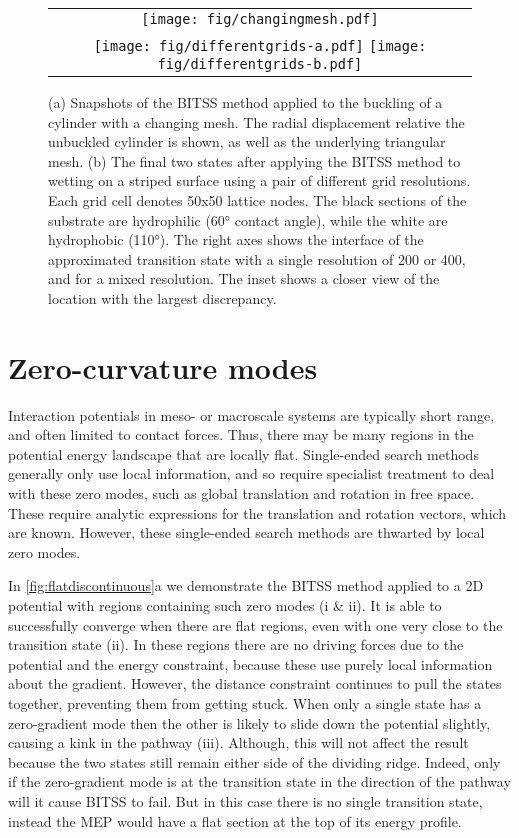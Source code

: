 \documentclass[aps,twocolumn]{revtex4}
\begin{document}
\begin{figure}[htb]
  \centering
  \begin{tabular}[b]{c}
    \texttt{[image: fig/changingmesh.pdf]}\\
    \texttt{[image: fig/differentgrids-a.pdf]}%
    \texttt{[image: fig/differentgrids-b.pdf]}%
  \end{tabular}
  \caption{
    (a) Snapshots of the BITSS method applied to the buckling of a cylinder with a changing mesh.
        The radial displacement relative the unbuckled cylinder is shown, as well as the underlying triangular mesh.
    (b) The final two states after applying the BITSS method to wetting on a striped surface using a pair of different grid resolutions.
        Each grid cell denotes 50x50 lattice nodes.
        The black sections of the substrate are hydrophilic (60\si{\degree} contact angle), while the white are hydrophobic (110\si{\degree}).
        The right axes shows the interface of the approximated transition state with a single resolution of 200 or 400, and for a mixed resolution.
        The inset shows a closer view of the location with the largest discrepancy.
  }
  \label{fig:differentgrids}
\end{figure}


\section{Zero-curvature modes}
Interaction potentials in meso- or macroscale systems are typically short range, and often limited to contact forces.
Thus, there may be many regions in the potential energy landscape that are locally flat.
Single-ended search methods generally only use local information, and so require specialist treatment to deal with these zero modes, such as global translation and rotation in free space.
These require analytic expressions for the translation and rotation vectors, which are known.
However, these single-ended search methods are thwarted by local zero modes.

In \cref{fig:flatdiscontinuous}a we demonstrate the BITSS method applied to a 2D potential with regions containing such zero modes (i \& ii).
It is able to successfully converge when there are flat regions, even with one very close to the transition state (ii).
In these regions there are no driving forces due to the potential and the energy constraint, because these use purely local information about the gradient.
However, the distance constraint continues to pull the states together, preventing them from getting stuck.
When only a single state has a zero-gradient mode then the other is likely to slide down the potential slightly, causing a kink in the pathway (iii).
Although, this will not affect the result because the two states still remain either side of the dividing ridge.
Indeed, only if the zero-gradient mode is at the transition state in the direction of the pathway will it cause BITSS to fail.
But in this case there is no single transition state, instead the MEP would have a flat section at the top of its energy profile. 
\end{document}
